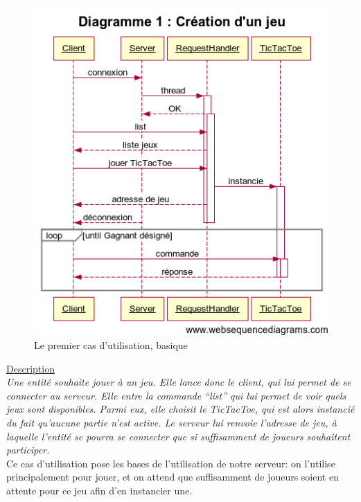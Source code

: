 	\begin{figure}[!ht]
		\center
		\includegraphics[scale=0.7]{images/sequence/diagramme_scenario1.png}
		\caption{Le premier cas d'utilisation, basique}
	\end{figure}
	
	\underline{Description}\\
	
	\textit{Une entité souhaite jouer à un jeu. Elle lance donc le client, qui lui permet de se connecter 
		au serveur. Elle entre la commande “list” qui lui permet de voir quels jeux sont disponibles. 
		Parmi eux, elle choisit le TicTacToe, qui est alors instancié du fait qu'aucune partie n'est active. Le serveur lui renvoie l'adresse de jeu, à laquelle l'entité se pourra se connecter que si suffisamment de joueurs souhaitent participer.}\\
	
	\vspace{3em}
	Ce cas d'utilisation pose les bases de l'utilisation de notre serveur: on l'utilise principalement pour jouer, et on attend que suffisamment de joueurs soient en attente pour ce jeu afin d'en instancier une.
	\newpage
	
